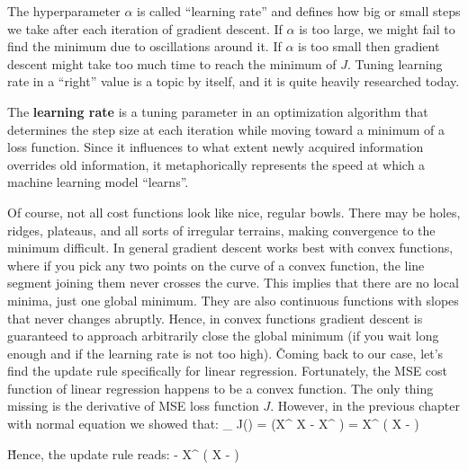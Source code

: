 \vspace{-9pt}


The hyperparameter $\alpha$ is called ``learning rate'' and defines how big or small steps we take after each
iteration of gradient descent. If $\alpha$ is too large, we might fail to find the minimum due to oscillations around
it. If $\alpha$ is too small then gradient descent might take too much time to reach the minimum of $J$. Tuning
learning rate in a ``right'' value is a topic by itself, and it is quite heavily researched today.

The \textbf{learning rate} is a tuning parameter in an optimization algorithm that determines the step size at each
iteration while moving toward a minimum of a loss function. Since it influences to what extent newly acquired
information overrides old information, it metaphorically represents the speed at which a machine learning model
``learns''.
\ed

\vspace{-12pt}


Of course, not all cost functions look like nice, regular bowls. There may be holes, ridges, plateaus, and all sorts
of irregular terrains, making convergence to the minimum difficult. In general gradient descent works best with
convex functions, where if you pick any two points on the curve of a convex function, the line segment joining them
never crosses the curve. This implies that there are no local minima, just one global minimum. They are also
continuous functions with slopes that never changes abruptly. Hence, in convex functions gradient descent is
guaranteed to approach arbitrarily close the global minimum (if you wait long enough and if the learning rate is not
too high). \v

Coming back to our case, let's find the update rule specifically for linear regression. Fortunately, the MSE cost
function of linear regression happens to be a convex function. The only thing missing is the derivative of MSE loss
function $J$. However, in the previous chapter with normal equation we showed that:
\bse
\nabla_{} J()
=  \Big(X^{\intercal} X - X^{\intercal}  \Big)
=  X^{\intercal} \Big( X - \Big)
\ese

\v

Hence, the update rule reads:
\bse
{} \coloneqq {} -  X^{\intercal} \Big( X  - \Big)
\ese

